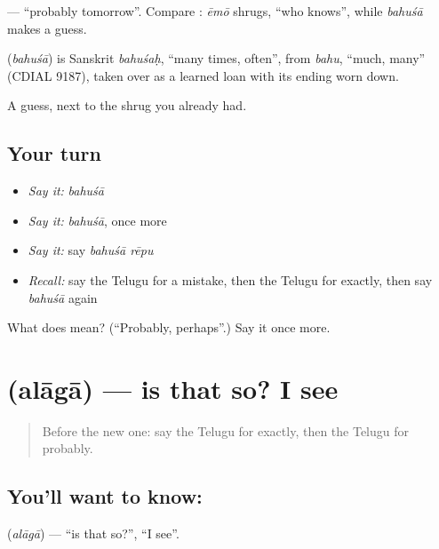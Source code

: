 \textbf{ } — \textquotedblleft{}probably tomorrow\textquotedblright{}. Compare \textbf{}: \emph{ēmō} shrugs, \textquotedblleft{}who knows\textquotedblright{}, while \emph{bahuśā} makes a guess.

\begin{cousinweb}
\textbf{} (\emph{bahuśā}) is Sanskrit \emph{bahuśaḥ}, \textquotedblleft{}many times, often\textquotedblright{}, from \emph{bahu}, \textquotedblleft{}much, many\textquotedblright{} (CDIAL 9187), taken over as a learned loan with its ending worn down.
\end{cousinweb}

\begin{grammarlens}[title={What you've built}]
A guess, next to the shrug you already had.
\end{grammarlens}

\subsection*{Your turn}
\begin{itemize}
\raggedright
  \item \emph{Say it:} \emph{bahuśā}
  \item \emph{Say it:} \emph{bahuśā}, once more
  \item \emph{Say it:} say \emph{bahuśā rēpu}
  \item \emph{Recall:} say the Telugu for a mistake, then the Telugu for exactly, then say \emph{bahuśā} again
\end{itemize}

\begin{tcolorbox}[breakable,colback=teal!4,colframe=teal!35!black,title={Before you move on}]
What does  mean? (\textquotedblleft{}Probably, perhaps\textquotedblright{}.) Say it once more.
\end{tcolorbox}
\section[\texorpdfstring{\te{అలాగా} (alāgā)}{అలాగా (alāgā)}]{ (alāgā) — is that so? I see}

\label{lesson:TE-C87-isee}



\begin{quote}
Before the new one: say the Telugu for exactly, then the Telugu for probably.
\end{quote}

\subsection*{You'll want to know: }
\textbf{} (\emph{alāgā}) — \textquotedblleft{}is that so?\textquotedblright{}, \textquotedblleft{}I see\textquotedblright{}.

